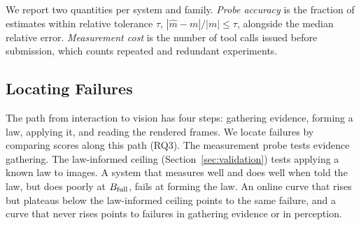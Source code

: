 We report two quantities per system and family. \emph{Probe accuracy} is the fraction of estimates within relative tolerance $\tau$, $|\hat m-m|/|m|\le\tau$, alongside the median relative error. \emph{Measurement cost} is the number of tool calls issued before submission, which counts repeated and redundant experiments. 

\subsection{Locating Failures}

The path from interaction to vision has four steps: gathering evidence, forming a law, applying it, and reading the rendered frames. We locate failures by comparing scores along this path (RQ3). The measurement probe tests evidence gathering. The law-informed ceiling (Section~\ref{sec:validation}) tests applying a known law to images. A system that measures well and does well when told the law, but does poorly at $B_{\rm full}$, fails at forming the law. An online curve that rises but plateaus below the law-informed ceiling points to the same failure, and a curve that never rises points to failures in gathering evidence or in perception.
